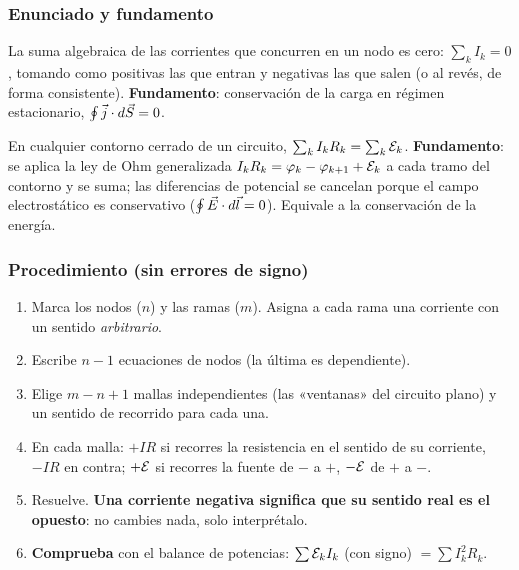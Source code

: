 \documentclass[11pt]{article}
\begin{document}
\subsubsection*{Enunciado y fundamento}
\begin{idea}
La suma algebraica de las corrientes que concurren en un nodo es cero: $\sum_k I_k=0$, tomando como positivas las que entran y negativas las que salen (o al revés, de forma consistente). \textbf{Fundamento}: conservación de la carga en régimen estacionario, $\oint\vec{j}\cdot d\vec S=0$.
\end{idea}
\begin{idea}
En cualquier contorno cerrado de un circuito, $\sum_k I_kR_k=\sum_k\mathcal{E}_k$. \textbf{Fundamento}: se aplica la ley de Ohm generalizada $I_kR_k=\varphi_k-\varphi_{k+1}+\mathcal{E}_k$ a cada tramo del contorno y se suma; las diferencias de potencial se cancelan porque el campo electrostático es conservativo ($\oint\vec{E}\cdot d\vec l=0$). Equivale a la conservación de la energía.
\end{idea}

\subsubsection*{Procedimiento (sin errores de signo)}
\begin{metodo}
\begin{enumerate}[leftmargin=*]
\item Marca los nodos ($n$) y las ramas ($m$). Asigna a cada rama una corriente con un sentido \emph{arbitrario}.
\item Escribe $n-1$ ecuaciones de nodos (la última es dependiente).
\item Elige $m-n+1$ mallas independientes (las «ventanas» del circuito plano) y un sentido de recorrido para cada una.
\item En cada malla: $+IR$ si recorres la resistencia en el sentido de su corriente, $-IR$ en contra; $+\mathcal{E}$ si recorres la fuente de $-$ a $+$, $-\mathcal{E}$ de $+$ a $-$.
\item Resuelve. \textbf{Una corriente negativa significa que su sentido real es el opuesto}: no cambies nada, solo interprétalo.
\item \textbf{Comprueba} con el balance de potencias: $\sum\mathcal{E}_kI_k$ (con signo) $=\sum I_k^2R_k$.
\end{enumerate}
\end{metodo}
\end{document}
